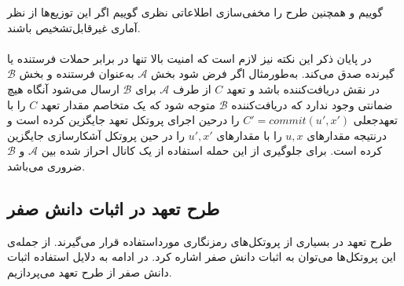  گوییم و همچنین طرح را مخفی‌سازی اطلاعاتی نظری
 گوییم اگر این توزیع‌ها از نظر آماری غیرقابل‌تشخیص باشند.
\\
\\
در پایان ذکر این نکته نیز لازم است که امنیت بالا تنها در برابر حملات فرستنده یا گیرنده صدق می‌کند. به‌طورمثال اگر فرض شود بخش
$\mathcal{A}$
به‌عنوان فرستنده و بخش
$\mathcal{B}$
در نقش دریافت‌کننده باشد و تعهد
$C$
از طرف
$\mathcal{A}$
برای
$\mathcal{B}$
ارسال می‌شود آنگاه هیچ ضمانتی وجود ندارد که دریافت‌کننده
$\mathcal{B}$
متوجه شود که یک متخاصم مقدار تعهد
$C$
را با تعهدجعلی
$C' = commit(u',x')$
را درحین اجرای پروتکل تعهد جایگزین کرده است و درنتیجه مقدارهای
$u,x$
را با مقدارهای
$u',x'$
را در حین پروتکل آشکارسازی جایگزین کرده است. برای جلوگیری از این حمله استفاده از یک کانال احراز شده بین
$\mathcal{A}$
و
$\mathcal{B}$
ضروری می‌باشد.
\fi


\subsection{طرح تعهد در اثبات دانش صفر}
طرح تعهد در بسیاری از پروتکل‌های رمزنگاری مورداستفاده قرار می‌گیرند. از جمله‌ی این پروتکل‌ها می‌توان به اثبات دانش صفر اشاره کرد.
در ادامه به‌ دلایل استفاده اثبات دانش صفر از طرح تعهد می‌پردازیم.

